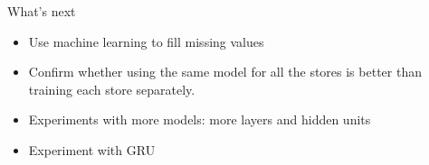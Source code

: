 \documentclass[10pt]{beamer}
\begin{document}
\begin{frame}{What's next}
    \begin{itemize}
        \item Use machine learning to fill missing values
        \item Confirm whether using the same model for all the stores is better than training each store separately.
        \item Experiments with more models: more layers and hidden units
        \item Experiment with GRU
    \end{itemize}
\end{frame}

\end{document}
